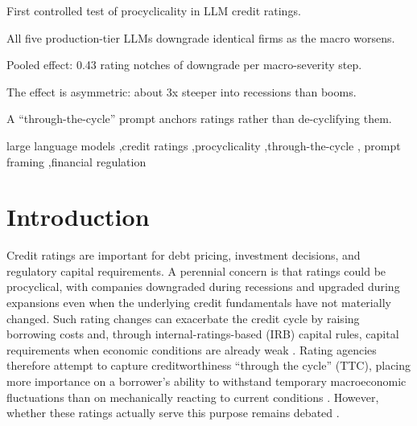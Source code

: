 \documentclass[a4paper,fleqn]{cas-sc}
\begin{document}
\begin{highlights}
\item First controlled test of procyclicality in LLM credit ratings.
\item All five production-tier LLMs downgrade identical firms as the macro worsens.
\item Pooled effect: 0.43 rating notches of downgrade per macro-severity step.
\item The effect is asymmetric: about 3x steeper into recessions than booms.
\item A ``through-the-cycle'' prompt anchors ratings rather than de-cyclifying them.
\end{highlights}

\begin{keywords}
large language models \sep credit ratings \sep procyclicality \sep through-the-cycle \sep
prompt framing \sep financial regulation
\end{keywords}

\maketitle

\section{Introduction}\label{sec:intro}
Credit ratings are important for debt pricing, investment decisions, and regulatory capital
requirements. A perennial concern is that ratings could be procyclical, with companies downgraded
during recessions and upgraded during expansions even when the underlying credit fundamentals have not
materially changed. Such rating changes can exacerbate the credit cycle by raising borrowing costs and,
through internal-ratings-based (IRB) capital rules, capital requirements when economic conditions are
already weak \citep{kashyap2004,gordy2006}. Rating agencies therefore attempt to capture
creditworthiness ``through the cycle'' (TTC), placing more importance on a borrower's ability to
withstand temporary macroeconomic fluctuations than on mechanically reacting to current conditions
\citep{amato2004,loffler2004}. However, whether these ratings actually serve this purpose remains
debated \citep{loffler2013}.
\end{document}

